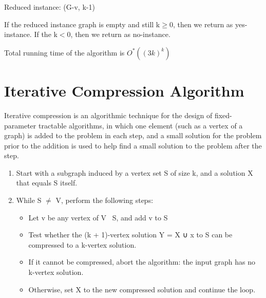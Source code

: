 Reduced instance: (G-v, k-1)

If the reduced instance graph is empty and still k$\geq$0, then we return as yes-instance.
If the k$<$0, then we return as no-instance.

Total running time of the algorithm is $O^*((3k)^k)$




\section{Iterative Compression Algorithm}

\hspace*{1.5cm} Iterative compression is an algorithmic technique for the design of
 fixed-parameter tractable algorithms,
in which one element (such as a vertex of a graph) is added to the problem in each step, 
and a small solution for the problem prior to the addition is used to help find a small 
solution to the problem after the step.

\begin{enumerate}
        \item Start with a subgraph induced by a vertex set S of size k, and a solution X 
        that equals S itself.
        \item While S $\neq$ V, perform the following steps:
        \begin{itemize}
                \item Let v be any vertex of V \ S, and add v to S \vspace{-0.4cm}
                \item Test whether the (k + 1)-vertex solution Y = X ∪ {x} to S can
                 be compressed to a k-vertex solution. \vspace{-0.4cm}
                \item If it cannot be compressed, abort the algorithm: the input graph has no 
                k-vertex solution. \vspace{-0.4cm}
                \item Otherwise, set X to the new compressed solution and continue
                 the loop.
        \end{itemize}
\end{enumerate}


\vspace{0.6cm}

